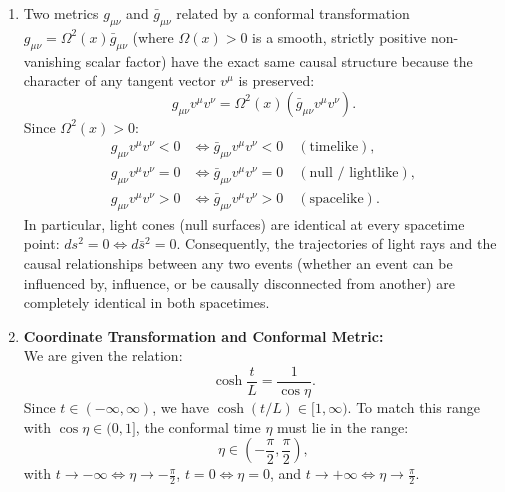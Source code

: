\documentclass[12pt]{article}
\begin{document}
\begin{enumerate}[label=\alph*)]
\item Two metrics $g_{\mu\nu}$ and $\bar{g}_{\mu\nu}$ related by a conformal transformation $g_{\mu\nu} = \Omega^2(x) \bar{g}_{\mu\nu}$ (where $\Omega(x) > 0$ is a smooth, strictly positive non-vanishing scalar factor) have the exact same causal structure because the character of any tangent vector $v^\mu$ is preserved:
\begin{equation}
g_{\mu\nu} v^\mu v^\nu = \Omega^2(x) \left( \bar{g}_{\mu\nu} v^\mu v^\nu \right).
\end{equation}
Since $\Omega^2(x) > 0$:
\begin{align}
g_{\mu\nu} v^\mu v^\nu < 0 &\iff \bar{g}_{\mu\nu} v^\mu v^\nu < 0 \quad (\text{timelike}), \\
g_{\mu\nu} v^\mu v^\nu = 0 &\iff \bar{g}_{\mu\nu} v^\mu v^\nu = 0 \quad (\text{null / lightlike}), \\
g_{\mu\nu} v^\mu v^\nu > 0 &\iff \bar{g}_{\mu\nu} v^\mu v^\nu > 0 \quad (\text{spacelike}).
\end{align}
In particular, light cones (null surfaces) are identical at every spacetime point: $ds^2 = 0 \iff d\bar{s}^2 = 0$. Consequently, the trajectories of light rays and the causal relationships between any two events (whether an event can be influenced by, influence, or be causally disconnected from another) are completely identical in both spacetimes.

\item \textbf{Coordinate Transformation and Conformal Metric:}\\
We are given the relation:
\begin{equation}
\cosh\frac{t}{L} = \frac{1}{\cos\eta}.
\end{equation}
Since $t \in (-\infty, \infty)$, we have $\cosh(t/L) \in [1, \infty)$. To match this range with $\cos\eta \in (0, 1]$, the conformal time $\eta$ must lie in the range:
\begin{equation}
\eta \in \left(-\frac{\pi}{2}, \frac{\pi}{2}\right),
\end{equation}
with $t \to -\infty \iff \eta \to -\frac{\pi}{2}$, $t = 0 \iff \eta = 0$, and $t \to +\infty \iff \eta \to \frac{\pi}{2}$.


\end{enumerate}
\end{document}

